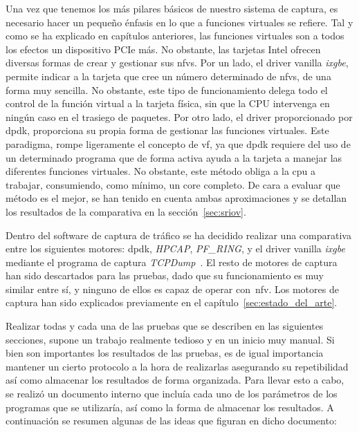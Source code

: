 Una vez que tenemos los más pilares básicos de nuestro sistema de captura, es necesario hacer un pequeño énfasis en lo que a funciones virtuales se refiere. Tal y como se ha explicado en capítulos anteriores, las funciones virtuales son a todos los efectos un dispositivo PCIe más. No obstante, las tarjetas Intel ofrecen diversas formas de crear y gestionar sus \glspl{nfv}. Por un lado, el driver \gls{vanilla} \textit{ixgbe}, permite indicar a la tarjeta que cree un número determinado de \glspl{nfv}, de una forma muy sencilla. No obstante, este tipo de funcionamiento delega todo el control de la función virtual a la tarjeta física, sin que la CPU intervenga en ningún caso en el trasiego de paquetes.
%
Por otro lado, el driver proporcionado por \gls{dpdk}, proporciona su propia forma de gestionar las funciones virtuales. Este paradigma, rompe ligeramente el concepto de \gls{vf}, ya que \gls{dpdk} requiere del uso de un determinado programa que de forma activa ayuda a la tarjeta a manejar las diferentes funciones virtuales. No obstante, este método obliga a la \gls{cpu} a trabajar, consumiendo, como mínimo, un \gls{core} completo. De cara a evaluar que método es el mejor, se han tenido en cuenta ambas aproximaciones y se detallan los resultados de la comparativa en la sección~\ref{sec:sriov}.

Dentro del software de captura de tráfico se ha decidido realizar una comparativa entre los siguientes motores: \gls{dpdk}, \textit{HPCAP}, \textit{PF\_RING}, y el driver \gls{vanilla} \textit{ixgbe} mediante el programa de captura \textit{TCPDump}~\cite{bib:tcpdump}. El resto de motores de captura han sido descartados para las pruebas, dado que su funcionamiento es muy similar entre sí, y ninguno de ellos es capaz de operar con~\gls{nfv}. Los motores de captura han sido explicados previamente en el capítulo~\ref{sec:estado_del_arte}.


Realizar todas y cada una de las pruebas que se describen en las siguientes secciones, supone un trabajo realmente tedioso y en un inicio muy manual. Si bien son importantes los resultados de las pruebas, es de igual importancia mantener un cierto protocolo a la hora de realizarlas asegurando su repetibilidad así como almacenar los resultados de forma organizada. Para llevar esto a cabo, se realizó un documento interno que incluía cada uno de los parámetros de los programas que se utilizaría, así como la forma de almacenar los resultados. A continuación se resumen algunas de las ideas que figuran en dicho documento:

